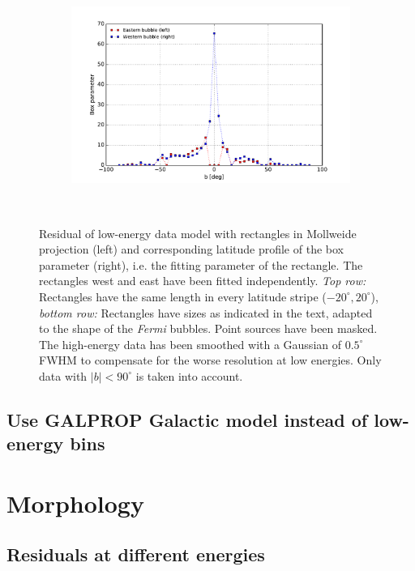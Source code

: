 \documentclass[a4paper]{article}
\newcommand{\Fermi}{\textit{Fermi} }
\begin{document}
\begin{figure}[H]
{\begin{subfigure}[b]{.5\textwidth}
	\end{subfigure}%
	\begin{subfigure}[b]{.5\textwidth}
		\centering
		\includegraphics[width=.95\textwidth]{FitE_boxprof_at_0-1_to_1-1663_norm_fitbubshape.pdf}
	\end{subfigure}%
	}\\
\caption{Residual of low-energy data model with rectangles in Mollweide projection (left) and corresponding latitude profile of the box parameter (right), i.e. the fitting parameter of the rectangle. The rectangles west and east have been fitted independently. \textit{Top row:} Rectangles have the same length in every latitude stripe ($-20^\circ, 20^\circ$), \textit{bottom row:} Rectangles have sizes as indicated in the text, adapted to the shape of the \Fermi bubbles. Point sources have been masked. The high-energy data has been smoothed with a Gaussian of $0.5^\circ$ FWHM to compensate for the worse resolution at low energies. Only data with $|b| < 90^\circ$ is taken into account.}
\label{boxes_fit}
\end{figure}






\subsection{Use GALPROP Galactic model instead of low-energy bins}



\section{Morphology}

\subsection{Residuals at different energies}
\end{document}
